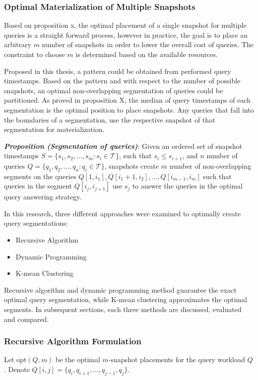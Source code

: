 \subsubsection{Optimal Materialization of Multiple Snapshots}
Based on proposition x, the optimal placement of a single snapshot for multiple queries is a straight forward process, however in practice, the goal is to place an arbitrary $m$ number of snapshots in order to lower the overall cost of queries. The constraint to choose $m$ is determined based on the available resources. 

Proposed in this thesis, a pattern could be obtained from performed query timestamps. Based on the pattern and with respect to the number of possible snapshots, an optimal non-overlapping segmentation of queries could be partitioned. As proved in proposition X, the median of query timestamps of each segmentation is the optimal position to place snapshots. Any queries that fall into the boundaries of a segmentation, use the respective snapshot of that segmentation for materialization. 

\textbf{\emph{Proposition (Segmentation of queries)}}: Given an ordered set of snapshot timestamps $S=\{s_1,s_2,...,s_m:s_i \in \mathcal{T}\}$, such that $s_i \leq s_{i+1}$, and $n$ number of queries $Q = \{q_1,q_2,...,q_n: q_i \in \mathcal{T}\}$, snapshots create $m$ number of non-overlapping segments on the queries $Q[1,i_1],Q[i_1+1,i_2],...,Q[i_{m-1},i_m]$ such that queries in the segment $Q[i_j,i_{j+1}]$ use $s_j$ to answer the queries in the optimal query answering strategy.  

In this research, three different approaches were examined to optimally create query segmentations:
\begin{itemize}
	\item Recursive Algorithm
	\item Dynamic Programming
	\item K-mean Clustering
\end{itemize}
Recursive algorithm and dynamic programming method guarantee the exact optimal query segmentation, while K-mean clustering approximates the optimal segments. In subsequent sections, each three methods are discussed, evaluated and compared.

\subsubsection{Recursive Algorithm Formulation} 
Let $\mathrm{opt}(Q, m)$ be the optimal $m$-snapshot placements for the query workload $Q$. Denote $Q[i,j] = \{q_i,q_{i+1},...,q_{j-1},q_j\}$.

